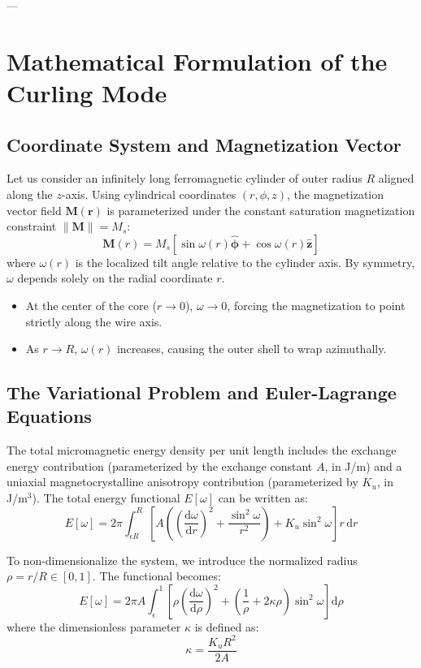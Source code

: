 \documentclass[11pt,a4paper]{article}
\newcommand{\dd}{\mathrm{d}}
\newcommand{\rhoadj}{\rho}
\newcommand{\kappaadim}{\kappa}
\begin{document}
---

\section{Mathematical Formulation of the Curling Mode}

\subsection{Coordinate System and Magnetization Vector}
Let us consider an infinitely long ferromagnetic cylinder of outer radius $R$ aligned along the $z$-axis. Using cylindrical coordinates $(r, \phi, z)$, the magnetization vector field $\bm{M}(\bm{r})$ is parameterized under the constant saturation magnetization constraint $\|\bm{M}\| = M_s$:
\begin{equation}
    \bm{M}(r) = M_s \left[ \sin\omega(r) \hat{\bm{\phi}} + \cos\omega(r) \hat{\bm{z}} \right]
\end{equation}
where $\omega(r)$ is the localized tilt angle relative to the cylinder axis. By symmetry, $\omega$ depends solely on the radial coordinate $r$.
\begin{itemize}
    \item At the center of the core ($r \to 0$), $\omega \to 0$, forcing the magnetization to point strictly along the wire axis.
    \item As $r \to R$, $\omega(r)$ increases, causing the outer shell to wrap azimuthally.
\end{itemize}

\subsection{The Variational Problem and Euler-Lagrange Equations}
The total micromagnetic energy density per unit length includes the exchange energy contribution (parameterized by the exchange constant $A$, in J/m) and a uniaxial magnetocrystalline anisotropy contribution (parameterized by $K_u$, in J/m$^3$). The total energy functional $E[\omega]$ can be written as:
\begin{equation}
    E[\omega] = 2\pi \int_{\epsilon R}^R \left[ A \left( \left(\frac{\dd \omega}{\dd r}\right)^2 + \frac{\sin^2\omega}{r^2} \right) + K_u \sin^2\omega \right] r \,\dd r
\end{equation}

To non-dimensionalize the system, we introduce the normalized radius $\rhoadj = r/R \in [0, 1]$. The functional becomes:
\begin{equation}
    E[\omega] = 2\pi A \int_\epsilon^1 \left[ \rhoadj \left(\frac{\dd \omega}{\dd \rhoadj}\right)^2 + \left( \frac{1}{\rhoadj} + 2\kappaadim\rhoadj \right)\sin^2\omega \right] \dd\rhoadj
\end{equation}
where the dimensionless parameter $\kappaadim$ is defined as:
\begin{equation}
    \kappaadim = \frac{K_u R^2}{2A}
\end{equation}
\end{document}
